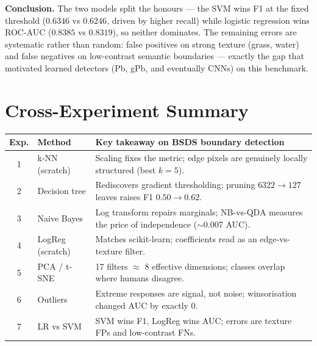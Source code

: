 \documentclass[11pt,a4paper]{article}
\begin{document}
\textbf{Conclusion.} The two models split the honours --- the SVM wins F1 at the fixed threshold ($0.6346$ vs $0.6246$, driven by higher recall) while logistic regression wins ROC-AUC ($0.8385$ vs $0.8319$), so neither dominates. The remaining errors are systematic rather than random: false positives on strong texture (grass, water) and false negatives on low-contrast semantic boundaries --- exactly the gap that motivated learned detectors (Pb, gPb, and eventually CNNs) on this benchmark.

\vspace{1em}
\section*{Cross-Experiment Summary}
\begin{center}\small
\begin{tabular}{@{}clp{9.5cm}@{}}
\toprule
Exp. & Method & Key takeaway on BSDS boundary detection\\
\midrule
1 & k-NN (scratch) & Scaling fixes the metric; edge pixels are genuinely locally structured (best $k{=}5$).\\
2 & Decision tree & Rediscovers gradient thresholding; pruning $6322\to127$ leaves raises F1 $0.50\to0.62$.\\
3 & Naive Bayes & Log transform repairs marginals; NB-vs-QDA measures the price of independence ($\sim$0.007 AUC).\\
4 & LogReg (scratch) & Matches scikit-learn; coefficients read as an edge-vs-texture filter.\\
5 & PCA / t-SNE & 17 filters $\approx$ 8 effective dimensions; classes overlap where humans disagree.\\
6 & Outliers & Extreme responses are signal, not noise; winsorisation changed AUC by exactly 0.\\
7 & LR vs SVM & SVM wins F1, LogReg wins AUC; errors are texture FPs and low-contrast FNs.\\
\bottomrule
\end{tabular}
\end{center}
\end{document}
